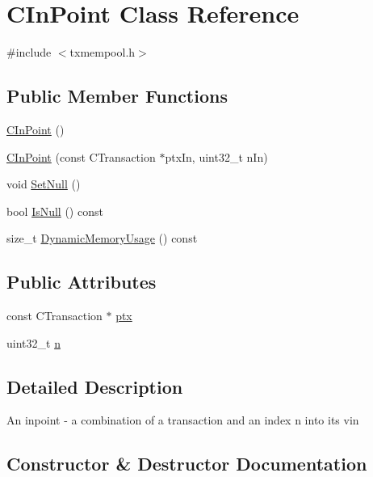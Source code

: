 \hypertarget{class_c_in_point}{}\section{C\+In\+Point Class Reference}
\label{class_c_in_point}


{\ttfamily \#include $<$txmempool.\+h$>$}

\subsection*{Public Member Functions}
\begin{DoxyCompactItemize}
\item 
\mbox{\hyperlink{class_c_in_point_ad44d4164a178cd7b0ddca6dd9f862d50}{C\+In\+Point}} ()
\item 
\mbox{\hyperlink{class_c_in_point_aa1aafd0f20137bcf79302bdb51ea2a0a}{C\+In\+Point}} (const C\+Transaction $\ast$ptx\+In, uint32\+\_\+t n\+In)
\item 
void \mbox{\hyperlink{class_c_in_point_af92945e76098bd920049f9f85a730e22}{Set\+Null}} ()
\item 
bool \mbox{\hyperlink{class_c_in_point_a959a51348c217c82773bbedee016af76}{Is\+Null}} () const
\item 
size\+\_\+t \mbox{\hyperlink{class_c_in_point_ab1c6e4bf3f021c4c8d0eca901dca732f}{Dynamic\+Memory\+Usage}} () const
\end{DoxyCompactItemize}
\subsection*{Public Attributes}
\begin{DoxyCompactItemize}
\item 
const C\+Transaction $\ast$ \mbox{\hyperlink{class_c_in_point_a76bf1c9b14d4ba95ff3e260cd47a9ce4}{ptx}}
\item 
uint32\+\_\+t \mbox{\hyperlink{class_c_in_point_a456e18a182bfa70cbf63d28561c3ae1c}{n}}
\end{DoxyCompactItemize}


\subsection{Detailed Description}
An inpoint -\/ a combination of a transaction and an index n into its vin 

\subsection{Constructor \& Destructor Documentation}
\mbox{\label{class_c_in_point_ad44d4164a178cd7b0ddca6dd9f862d50}} 
